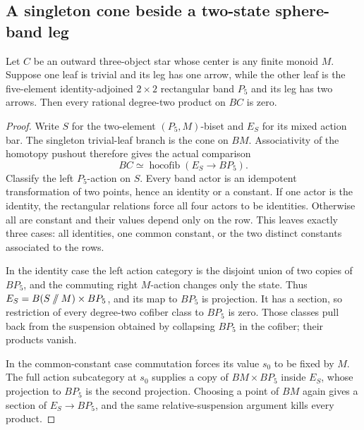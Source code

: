 \subsection{A singleton cone beside a two-state sphere-band leg}

\begin{lemma}\label{C:star-singleton-sphere-two-states}
Let $C$ be an outward three-object star whose center is any
finite monoid $M$. Suppose one leaf is trivial and its leg
has one arrow, while the other leaf is the five-element
identity-adjoined $2\times2$ rectangular band $P_5$ and its
leg has two arrows. Then every rational degree-two product
on $BC$ is zero.
\end{lemma}
\begin{proof}
Write $S$ for the two-element $(P_5,M)$-biset and $E_S$ for
its mixed action bar. The singleton trivial-leaf branch is
the cone on $BM$. Associativity of the homotopy pushout
therefore gives the actual comparison
\[
 BC\simeq\operatorname{hocofib}(E_S\longrightarrow BP_5).
\]
Classify the left $P_5$-action on $S$. Every band actor is
an idempotent transformation of two points, hence an identity
or a constant. If one actor is the identity, the rectangular
relations force all four actors to be identities. Otherwise
all are constant and their values depend only on the row.
This leaves exactly three cases: all identities, one common
constant, or the two distinct constants associated to the rows.

In the identity case the left action category is the disjoint
union of two copies of $BP_5$, and the commuting right
$M$-action changes only the state. Thus
$E_S=B(S\mathbin{/\mkern-6mu/}M)\times BP_5$, and its map
to $BP_5$ is projection. It has a section, so restriction
of every degree-two cofiber class to $BP_5$ is zero.
Those classes pull back from the suspension obtained by
collapsing $BP_5$ in the cofiber; their products vanish.

In the common-constant case commutation forces its value
$s_0$ to be fixed by $M$. The full action subcategory at
$s_0$ supplies a copy of $BM\times BP_5$ inside $E_S$,
whose projection to $BP_5$ is the second projection.
Choosing a point of $BM$ again gives a section of
$E_S\to BP_5$, and the same relative-suspension argument
kills every product.


\end{proof}
